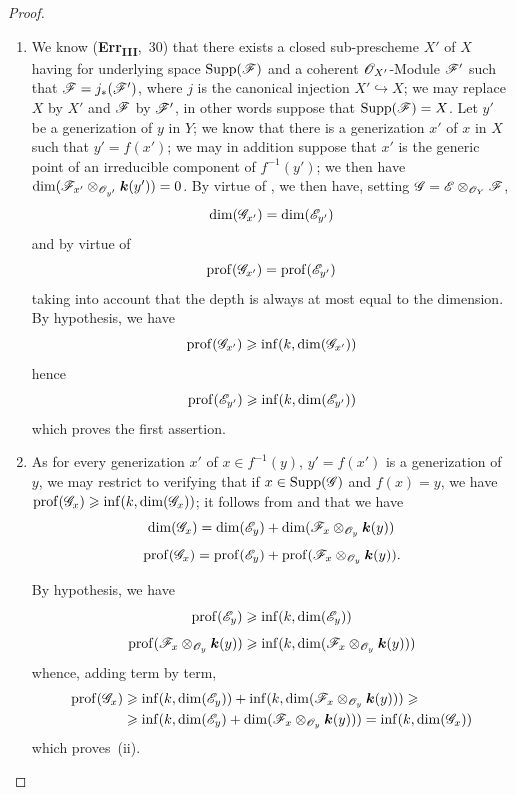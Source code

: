 \begin{proof}
\medskip\noindent
\begin{enumerate}[label=(\roman*)]
  \item We know (\textbf{Err}\textsubscript{\textbf{III}},~30) that there exists a closed sub-prescheme $X'$ of $X$ having for underlying space $\operatorname{Supp}(\mathscr{F})$ and a coherent $\mathscr{O}_{X'}$-Module $\mathscr{F}'$ such that $\mathscr{F}=j_*(\mathscr{F}')$, where $j$ is the canonical injection $X'\hookrightarrow X$; we may replace $X$ by $X'$ and $\mathscr{F}$ by $\mathscr{F}'$, in other words suppose that $\operatorname{Supp}(\mathscr{F})=X$.
Let $y'$ be a generization of $y$ in $Y$; we know  that there is a generization $x'$ of $x$ in $X$ such that $y'=f(x')$; we may in addition suppose that $x'$ is the generic point of an irreducible component of $f^{-1}(y')$; we then have $\dim(\mathscr{F}_{x'}\otimes_{\mathscr{O}_{y'}}\boldsymbol{k}(y'))=0$.
By virtue of , we then have, setting $\mathscr{G}=\mathscr{E}\otimes_{\mathscr{O}_Y}\mathscr{F}$,
\[
  \dim(\mathscr{G}_{x'})=\dim(\mathscr{E}_{y'})
\]
and by virtue of 
\[
  \operatorname{prof}(\mathscr{G}_{x'})=\operatorname{prof}(\mathscr{E}_{y'})
\]
taking into account that the depth is always at most equal to the dimension.
By hypothesis, we have
\[
  \operatorname{prof}(\mathscr{G}_{x'})\geqslant\inf(k,\dim(\mathscr{G}_{x'}))
\]
hence
\[
  \operatorname{prof}(\mathscr{E}_{y'})\geqslant\inf(k,\dim(\mathscr{E}_{y'}))
\]
which proves the first assertion.

  \item As for every generization $x'$ of $x\in f^{-1}(y)$, $y'=f(x')$ is a generization of $y$, we may restrict to verifying that if $x\in\operatorname{Supp}(\mathscr{G})$ and $f(x)=y$, we have $\operatorname{prof}(\mathscr{G}_x)\geqslant\inf(k,\dim(\mathscr{G}_x))$; it follows from  and  that we have
\[
  \dim(\mathscr{G}_x)=\dim(\mathscr{E}_y)+\dim(\mathscr{F}_x\otimes_{\mathscr{O}_y}\boldsymbol{k}(y))
\]
\[
  \operatorname{prof}(\mathscr{G}_x)=\operatorname{prof}(\mathscr{E}_y)+\operatorname{prof}(\mathscr{F}_x\otimes_{\mathscr{O}_y}\boldsymbol{k}(y)).
\]

By hypothesis, we have
\[
  \operatorname{prof}(\mathscr{E}_y)\geqslant\inf(k,\dim(\mathscr{E}_y))
\]
\[
  \operatorname{prof}(\mathscr{F}_x\otimes_{\mathscr{O}_y}\boldsymbol{k}(y))\geqslant\inf(k,\dim(\mathscr{F}_x\otimes_{\mathscr{O}_y}\boldsymbol{k}(y)))
\]
whence, adding term by term,
\begin{align*}
  \operatorname{prof}(\mathscr{G}_x)&\geqslant\inf(k,\dim(\mathscr{E}_y))+\inf(k,\dim(\mathscr{F}_x\otimes_{\mathscr{O}_y}\boldsymbol{k}(y)))\geqslant{}\\
  &\geqslant\inf(k,\dim(\mathscr{E}_y)+\dim(\mathscr{F}_x\otimes_{\mathscr{O}_y}\boldsymbol{k}(y)))=\inf(k,\dim(\mathscr{G}_x))
\end{align*}
which proves~(ii).
\end{enumerate}
\end{proof}

